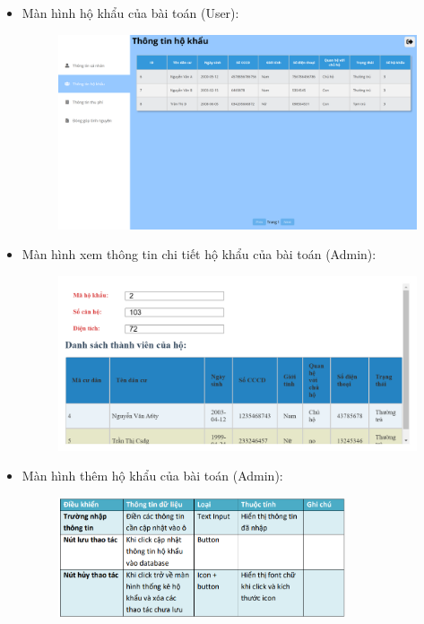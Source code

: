 \documentclass{article}
\begin{document}
\begin{itemize}
\begin{figure}[H]
    \end{figure}
    \vspace{4cm}
    \item Màn hình hộ khẩu của bài toán (User):
    \begin{figure}[H]
        \centering
        \includegraphics[width=1\textwidth]{Ảnh chương 4/Thông tin hộ khẩu User.png}
    \end{figure}
    \vspace{1cm}
    \item Màn hình xem thông tin chi tiết hộ khẩu của bài toán (Admin):
    \begin{figure}[H]
        \centering
        \includegraphics[width=1\textwidth]{Ảnh chương 4/Thông tin hộ khẩu Admin.png}
    \end{figure}
    \vspace{5cm}
    \item Màn hình thêm hộ khẩu của bài toán (Admin):
    \begin{figure}[H]
        \centering
        \includegraphics[width=0.8\textwidth]{Ảnh chương 4/Thêm hộ khẩu Admin.png}

\end{figure}
\end{itemize}
\end{document}
